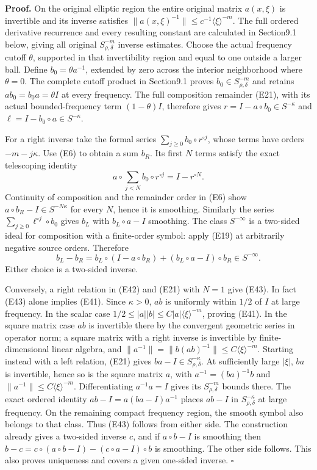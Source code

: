 \documentclass[
  11pt,
]{article}
\begin{document}
\textbf{Proof.} On the original elliptic region the entire original
matrix \(a(x,\xi)\) is invertible and its inverse satisfies
\(\|a(x,\xi)^{-1}\|\leq c^{-1}\langle\xi\rangle^{-m}\). The full ordered
derivative recurrence and every resulting constant are calculated in
Section9.1 below, giving all original \(S^{-m}_{\rho,\delta}\) inverse
estimates. Choose the actual frequency cutoff \(\theta\), supported in
that invertibility region and equal to one outside a larger ball. Define
\(b_0=\theta a^{-1}\), extended by zero across the interior neighborhood
where \(\theta=0\). The complete cutoff product in Section9.1 proves
\(b_0\in S^{-m}_{\rho,\delta}\) and retains \(ab_0=b_0a=\theta I\) at
every frequency. The full composition remainder (E21), with its actual
bounded-frequency term \((1-\theta)I\), therefore gives
\(r=I-a\circ b_0\in S^{-\kappa}\) and
\(\ell=I-b_0\circ a\in S^{-\kappa}\).

For a right inverse take the formal series
\(\sum_{j\geq0}b_0\circ r^{\circ j}\), whose terms have orders
\(-m-j\kappa\). Use (E6) to obtain a sum \(b_R\). Its first \(N\) terms
satisfy the exact telescoping identity \[
a\circ\sum_{j<N}b_0\circ r^{\circ j}=I-r^{\circ N}.
\tag{E44}
\] Continuity of composition and the remainder order in (E6) show
\(a\circ b_R-I\in S^{-N\kappa}\) for every \(N\), hence it is smoothing.
Similarly the series \(\sum_{j\geq0}\ell^{\circ j}\circ b_0\) gives
\(b_L\) with \(b_L\circ a-I\) smoothing. The class \(S^{-\infty}\) is a
two-sided ideal for composition with a finite-order symbol: apply (E19)
at arbitrarily negative source orders. Therefore \[
b_L-b_R=b_L\circ(I-a\circ b_R)
+(b_L\circ a-I)\circ b_R\in S^{-\infty}.
\tag{E45}
\] Either choice is a two-sided inverse.

Conversely, a right relation in (E42) and (E21) with \(N=1\) give (E43).
In fact (E43) alone implies (E41). Since \(\kappa>0\), \(ab\) is
uniformly within \(1/2\) of \(I\) at large frequency. In the scalar case
\(1/2\leq|a||b|\leq C|a|\langle\xi\rangle^{-m}\), proving (E41). In the
square matrix case \(ab\) is invertible there by the convergent
geometric series in operator norm; a square matrix with a right inverse
is invertible by finite-dimensional linear algebra, and
\(\|a^{-1}\|=\|b(ab)^{-1}\|\leq C\langle\xi\rangle^{-m}\). Starting
instead with a left relation, (E21) gives
\(ba-I\in S^{-\kappa}_{\rho,\delta}\). At sufficiently large \(|\xi|\),
\(ba\) is invertible, hence so is the square matrix \(a\), with
\(a^{-1}=(ba)^{-1}b\) and \(\|a^{-1}\|\le C\langle\xi\rangle^{-m}\).
Differentiating \(a^{-1}a=I\) gives its \(S^{-m}_{\rho,\delta}\) bounds
there. The exact ordered identity \(ab-I=a(ba-I)a^{-1}\) places \(ab-I\)
in \(S^{-\kappa}_{\rho,\delta}\) at large frequency. On the remaining
compact frequency region, the smooth symbol also belongs to that class.
Thus (E43) follows from either side. The construction already gives a
two-sided inverse \(c\), and if \(a\circ b-I\) is smoothing then
\(b-c=c\circ(a\circ b-I)-(c\circ a-I)\circ b\) is smoothing. The other
side follows. This also proves uniqueness and covers a given one-sided
inverse. \(\square\)
\end{document}

